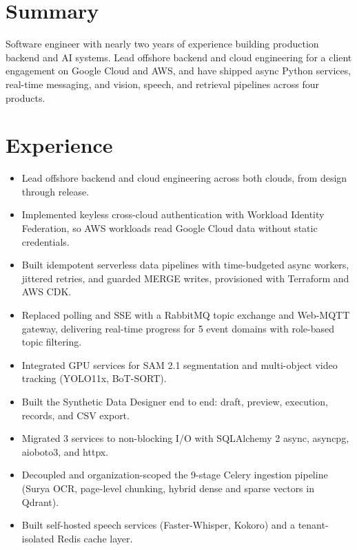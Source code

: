 \documentclass[10pt,a4paper]{article}
\begin{document}

\section{Summary}
Software engineer with nearly two years of experience building production backend and AI systems. Lead offshore backend and cloud engineering for a client engagement on Google Cloud and AWS, and have shipped async Python services, real-time messaging, and vision, speech, and retrieval pipelines across four products.

\section{Experience}

\begin{itemize}
  \item Lead offshore backend and cloud engineering across both clouds, from design through release.
  \item Implemented keyless cross-cloud authentication with Workload Identity Federation, so AWS workloads read Google Cloud data without static credentials.
  \item Built idempotent serverless data pipelines with time-budgeted async workers, jittered retries, and guarded MERGE writes, provisioned with Terraform and AWS CDK.
\end{itemize}

\begin{itemize}
  \item Replaced polling and SSE with a RabbitMQ topic exchange and Web-MQTT gateway, delivering real-time progress for 5 event domains with role-based topic filtering.
  \item Integrated GPU services for SAM 2.1 segmentation and multi-object video tracking (YOLO11x, BoT-SORT).
  \item Built the Synthetic Data Designer end to end: draft, preview, execution, records, and CSV export.
\end{itemize}

\begin{itemize}
  \item Migrated 3 services to non-blocking I/O with SQLAlchemy 2 async, asyncpg, aioboto3, and httpx.
  \item Decoupled and organization-scoped the 9-stage Celery ingestion pipeline (Surya OCR, page-level chunking, hybrid dense and sparse vectors in Qdrant).
  \item Built self-hosted speech services (Faster-Whisper, Kokoro) and a tenant-isolated Redis cache layer.
\end{itemize}
\end{document}
